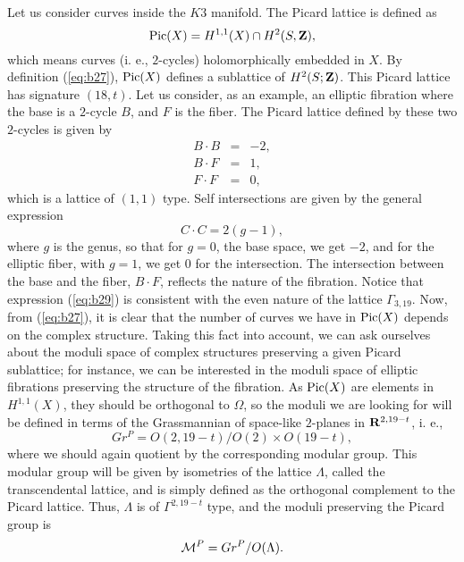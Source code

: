Let us consider curves inside the $K3$ manifold. The Picard lattice is defined as
\begin{equation}
\hbox {Pic} (X) = H^{1,1}(X) \cap H^2(S,{\bf Z}),
\label{eq:b27}
\end{equation}
which means curves (i. e., $2$-cycles) holomorphically embedded
in $X$. By definition (\ref{eq:b27}), $\hbox {Pic}(X)$ defines a
sublattice of $H^2(S;{\bf Z})$. This Picard lattice has signature
$(18,t)$. Let us consider, as an example, an elliptic fibration
where the base is a $2$-cycle $B$, and $F$ is the fiber. The
Picard lattice defined by these two $2$-cycles is given by
\begin{eqnarray}
B \cdot B & = & -2, \nonumber \\
B \cdot F & = & 1, \nonumber \\
F \cdot F & = & 0,
\label{eq:b28}
\end{eqnarray}
which is a lattice of $(1,1)$ type. Self intersections are given
by the general expression
\begin{equation}
C \cdot C = 2(g-1),
\label{eq:b29}
\end{equation}
where $g$ is the genus, so that for $g=0$, the base space, we get
$-2$, and for the elliptic fiber, with $g=1$, we get $0$ for the
intersection. The intersection between the base and the fiber, $B
\cdot F$, reflects the nature of the fibration. Notice that
expression (\ref{eq:b29}) is consistent with the even nature of
the lattice $\Gamma_{3,19}$. Now, from (\ref{eq:b27}), it is
clear that the number of curves we have in $\hbox {Pic} (X)$
depends on the complex structure. Taking this fact into account, 
we can ask ourselves about the moduli space of complex structures
preserving a given Picard sublattice; for instance, we can be
interested in the moduli space of elliptic fibrations preserving
the structure of the fibration. As $\hbox {Pic} (X)$ are elements
in $H^{1,1}(X)$, they should be orthogonal to $\Omega$, so the
moduli we are looking for will be defined in terms of the
Grassmannian of space-like $2$-planes in ${\bf R}^{2,19-t}$, i.
e.,
\begin{equation}
Gr^P = O(2,19-t)/O(2) \times O(19-t),
\label{eq:b30}
\end{equation}
where we should again quotient by the corresponding modular
group. This modular group will be given by isometries of the
lattice $\Lambda$, called the transcendental lattice, and is simply
defined as the orthogonal complement to the Picard lattice. Thus,
$\Lambda$ is of $\Gamma^{2,19-t}$ type, and the moduli preserving the
Picard group is
\begin{equation}
{\cal M}^P = Gr^P/O(\Lambda).
\label{eq:b31}
\end{equation}
  

